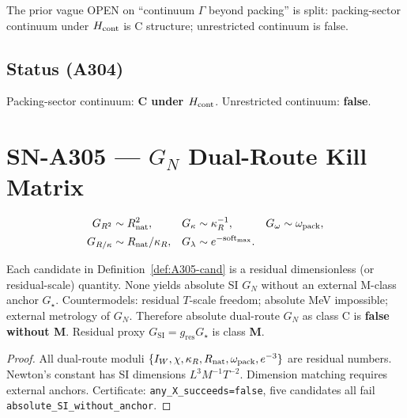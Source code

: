 \begin{remark}
The prior vague OPEN on ``continuum $\Gamma$ beyond packing'' is split:
packing-sector continuum under $H_{\rm cont}$ is C structure; unrestricted continuum is false.
\end{remark}

\subsection*{Status (A304)}
Packing-sector continuum: \textbf{C under $H_{\rm cont}$}. Unrestricted continuum: \textbf{false}.

\section{SN-A305 --- $G_N$ Dual-Route Kill Matrix}
\label{sec:SN-A305}

\begin{definition}
\label{def:A305-cand}
\begin{equation}
\begin{aligned}
G_{R^2}&\sim R_{\rm nat}^2,&
G_{\kappa}&\sim\kappa_R^{-1},&
G_{\omega}&\sim\omega_{\mathrm{pack}},\\
G_{R/\kappa}&\sim R_{\rm nat}/\kappa_R,&
G_{\lambda}&\sim e^{-\mathrm{soft}_{\max}}.
\end{aligned}
\end{equation}
\end{definition}

\begin{theorem}
\label{thm:A305-kill}
Each candidate in Definition~\ref{def:A305-cand} is a residual dimensionless (or residual-scale)
quantity. None yields absolute SI $G_N$ without an external M-class anchor $G_\star$.
Countermodels: residual $T$-scale freedom; absolute MeV impossible; external metrology of $G_N$.
Therefore absolute dual-route $G_N$ as class C is \textbf{false without M}.
Residual proxy $G_{\mathrm{SI}}=g_{\mathrm{res}}G_\star$ is class \textbf{M}.
\end{theorem}

\begin{proof}
All dual-route moduli $\{I_W,\chi,\kappa_R,R_{\rm nat},\omega_{\mathrm{pack}},e^{-3}\}$ are residual numbers.
Newton's constant has SI dimensions $L^3M^{-1}T^{-2}$. Dimension matching requires external anchors.
Certificate: \texttt{any\_X\_succeeds=false}, five candidates all fail \texttt{absolute\_SI\_without\_anchor}.
\end{proof}

